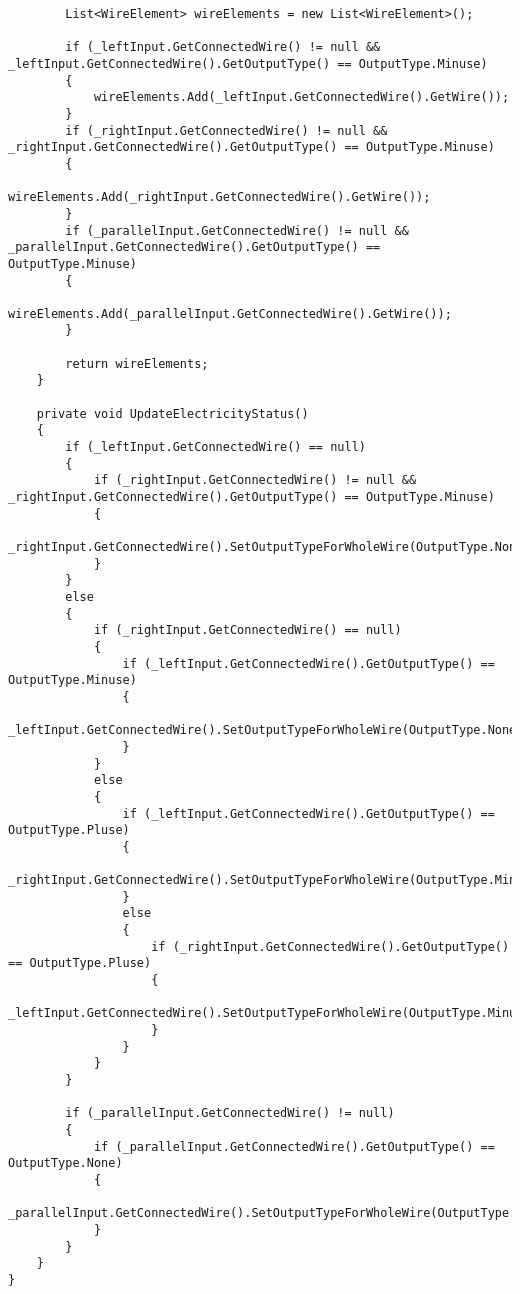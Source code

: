 \begin{verbatim}
        List<WireElement> wireElements = new List<WireElement>();

        if (_leftInput.GetConnectedWire() != null && _leftInput.GetConnectedWire().GetOutputType() == OutputType.Minuse)
        {
            wireElements.Add(_leftInput.GetConnectedWire().GetWire());
        }
        if (_rightInput.GetConnectedWire() != null && _rightInput.GetConnectedWire().GetOutputType() == OutputType.Minuse)
        {
            wireElements.Add(_rightInput.GetConnectedWire().GetWire());
        }
        if (_parallelInput.GetConnectedWire() != null && _parallelInput.GetConnectedWire().GetOutputType() == OutputType.Minuse)
        {
            wireElements.Add(_parallelInput.GetConnectedWire().GetWire());
        }

        return wireElements;
    }

    private void UpdateElectricityStatus()
    {
        if (_leftInput.GetConnectedWire() == null)
        {
            if (_rightInput.GetConnectedWire() != null && _rightInput.GetConnectedWire().GetOutputType() == OutputType.Minuse)
            {
                _rightInput.GetConnectedWire().SetOutputTypeForWholeWire(OutputType.None);
            }
        }
        else
        {
            if (_rightInput.GetConnectedWire() == null)
            {
                if (_leftInput.GetConnectedWire().GetOutputType() == OutputType.Minuse)
                {
                    _leftInput.GetConnectedWire().SetOutputTypeForWholeWire(OutputType.None);
                }
            }
            else
            {
                if (_leftInput.GetConnectedWire().GetOutputType() == OutputType.Pluse)
                {
                    _rightInput.GetConnectedWire().SetOutputTypeForWholeWire(OutputType.Minuse);
                }
                else
                {
                    if (_rightInput.GetConnectedWire().GetOutputType() == OutputType.Pluse)
                    {
                        _leftInput.GetConnectedWire().SetOutputTypeForWholeWire(OutputType.Minuse);
                    }
                }
            }
        }

        if (_parallelInput.GetConnectedWire() != null)
        {
            if (_parallelInput.GetConnectedWire().GetOutputType() == OutputType.None)
            {
                _parallelInput.GetConnectedWire().SetOutputTypeForWholeWire(OutputType.Minuse);
            }
        }
    }
}

\end{verbatim}
